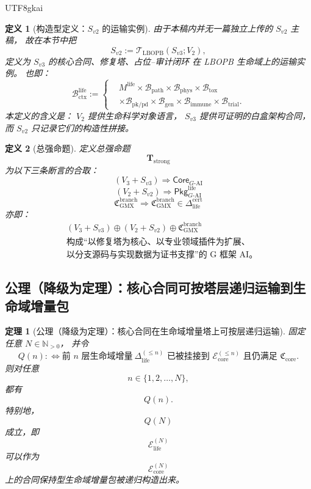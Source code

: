 \documentclass[12pt]{article}
\newtheorem{definition}{定义}[section]
\newtheorem{theorem}{定理}[section]
\newcommand{\NN}{\mathbb{N}}
\begin{document}
\begin{CJK*}{UTF8}{gkai}
\begin{definition}[构造型定义：\texorpdfstring{$S_{v2}$}{S-v2} 的运输实例]
\label{def:tex39-ch3-sv2}
由于本稿内并无一篇独立上传的 $S_{v2}$ 主稿，
故在本节中把
\[
  S_{v2}
  :=
  \mathcal T_{\mathrm{LBOPB}}(S_{v3};V_2),
\]
定义为
$S_{v3}$ 的核心合同、修复塔、占位--审计闭环
在 LBOPB 生命域上的运输实例。
也即：
\[
  \mathcal B_{\mathrm{ctx}}^{\mathrm{life}}
  :=
  \left\{
  \begin{aligned}
    &M^{\mathrm{life}}
    \times
    \mathcal B_{\mathrm{path}}
    \times
    \mathcal B_{\mathrm{phys}}
    \times
    \mathcal B_{\mathrm{tox}}\\
    &\times
    \mathcal B_{\mathrm{pk/pd}}
    \times
    \mathcal B_{\mathrm{gen}}
    \times
    \mathcal B_{\mathrm{immune}}
    \times
    \mathcal B_{\mathrm{trial}}.
  \end{aligned}
  \right.
\]
本定义的含义是：
$V_2$ 提供生命科学对象语言，
$S_{v3}$ 提供可证明的白盒架构合同，
而 $S_{v2}$ 只记录它们的构造性拼接。
\end{definition}

\begin{definition}[总强命题]
\label{def:tex39-ch3-strong}
定义总强命题
\[
  \mathbf T_{\mathrm{strong}}
\]
为以下三条断言的合取：
\[
  \boxed{
    (V_3+S_{v3}) \Longrightarrow \mathsf{Core}_{G\text{-AI}}
  }
\]
\[
  \boxed{
    (V_2+S_{v2}) \Longrightarrow \mathsf{Pkg}_{G\text{-AI}}^{\mathrm{life}}
  }
\]
\[
  \boxed{
    \mathfrak C_{\mathrm{GMX}}^{\mathrm{branch}}
    \Longrightarrow
    \mathfrak C_{\mathrm{GMX}}^{\mathrm{branch}}
    \in
    \Delta_{\mathrm{life}}^{\mathrm{cert}}
  }
\]
亦即：
\[
  \boxed{
    \begin{aligned}
      &(V_3+S_{v3})
      \oplus
      (V_2+S_{v2})
      \oplus
      \mathfrak C_{\mathrm{GMX}}^{\mathrm{branch}}\\
      &\text{构成“以修复塔为核心、以专业领域插件为扩展、}\\
      &\text{以分支源码与实现数据为证书支撑”的 G 框架 AI。}
    \end{aligned}
  }
\]
\end{definition}

\subsection{公理（降级为定理）：核心合同可按塔层递归运输到生命域增量包}
\label{subsec:tex39-ch3-axiom}

\begin{theorem}[公理（降级为定理）：核心合同在生命域增量塔上可按层递归运输]
\label{thm:tex39-ch3-transport}
固定任意 $N\in\NN_{>0}$，
并令
\[
  Q(n)
  :
  \Longleftrightarrow
  \text{前 }n\text{ 层生命域增量}
  \ \Delta_{\mathrm{life}}^{(\le n)}
  \text{ 已被挂接到 }
  \mathcal E_{\mathrm{core}}^{(\le n)}
  \text{ 且仍满足 }
  \mathfrak C_{\mathrm{core}}.
\]
则对任意
\[
  n\in\{1,2,\dots,N\},
\]
都有
\[
  Q(n).
\]
特别地，
\[
  Q(N)
\]
成立，即
\[
  \mathcal E_{\mathrm{life}}^{(N)}
\]
可以作为
\[
  \mathcal E_{\mathrm{core}}^{(N)}
\]
上的合同保持型生命域增量包被递归构造出来。
\end{theorem}


\end{CJK*}
\end{document}
